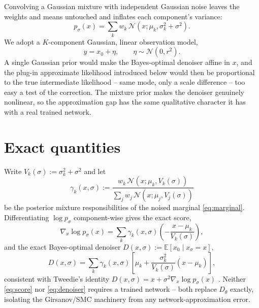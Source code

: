 \documentclass[english,10pt]{article}
\numberwithin{equation}{section}
\begin{document}
Convolving a Gaussian mixture with independent Gaussian noise leaves the
weights and means untouched and inflates each component's variance:
\begin{equation}
p_\sigma(x) = \sum_k w_k\,\mathcal N(x;\mu_k,\sigma_k^2+\sigma^2).
\label{eq:marginal}
\end{equation}
We adopt a $K$-component Gaussian, linear observation model,
\begin{equation}
y = x_0 + \eta, \qquad \eta\sim\mathcal N(0,r^2).
\label{eq:likelihood}
\end{equation}
A single Gaussian prior would make the Bayes-optimal denoiser affine in $x$,
and the plug-in approximate likelihood introduced below would then be
proportional to the true intermediate likelihood -- same mode, only a scale
difference -- too easy a test of the correction. The mixture prior makes the
denoiser genuinely nonlinear, so the approximation gap has the same
qualitative character it has with a real trained network.

\section{Exact quantities}
\label{sec:exact}

Write $V_k(\sigma):=\sigma_k^2+\sigma^2$ and let
\begin{equation}
\gamma_k(x,\sigma) := \frac{w_k\,\mathcal N(x;\mu_k,V_k(\sigma))}{\sum_j w_j\,\mathcal N(x;\mu_j,V_j(\sigma))}
\label{eq:responsibility}
\end{equation}
be the posterior mixture responsibilities of the noised marginal
\eqref{eq:marginal}. Differentiating $\log p_\sigma$ component-wise gives the
exact score,
\begin{equation}
\nabla_x\log p_\sigma(x) = \sum_k \gamma_k(x,\sigma)\left(-\frac{x-\mu_k}{V_k(\sigma)}\right),
\label{eq:score}
\end{equation}
and the exact Bayes-optimal denoiser $D(x,\sigma):=\mathbb E[x_0\mid x_\sigma=x]$,
\begin{equation}
D(x,\sigma) = \sum_k \gamma_k(x,\sigma)\left[\mu_k + \frac{\sigma_k^2}{V_k(\sigma)}(x-\mu_k)\right],
\label{eq:denoiser}
\end{equation}
consistent with Tweedie's identity $D(x,\sigma)=x+\sigma^2\nabla_x\log p_\sigma(x)$
\citep{efron2011tweedie}. Neither \eqref{eq:score} nor \eqref{eq:denoiser}
requires a trained network -- both replace $D_\theta$ exactly, isolating the
Girsanov/SMC machinery from any network-approximation error.
\end{document}
